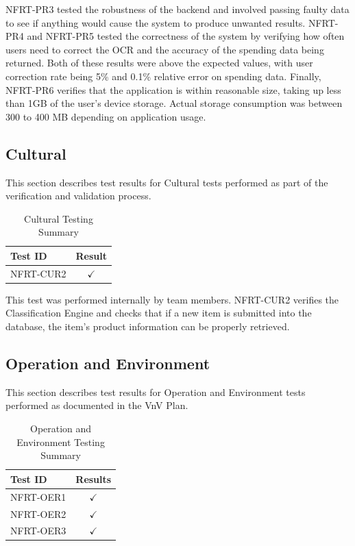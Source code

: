 \documentclass[12pt, titlepage]{article}
\begin{document}
NFRT-PR3 tested the robustness of the backend and involved passing faulty data to see if anything would cause the
system to produce unwanted results. NFRT-PR4 and NFRT-PR5 tested the correctness of the system by verifying how
often users need to correct the OCR and the accuracy of the spending data being returned. Both of these results
were above the expected values, with user correction rate being 5\% and 0.1\% relative error on spending data. Finally,
NFRT-PR6 verifies that the application is within reasonable size, taking up less than 1GB of the user's device
storage. Actual storage consumption was between 300 to 400 MB depending on application usage.

\subsection{Cultural}

This section describes test results for Cultural tests performed as part of the verification
and validation process.

\begin{longtable}{|l|c|}
  \caption{Cultural Testing Summary} \label{Cultural Testing Summary} \\
  \toprule
  \textbf{Test ID} & \textbf{Result} \\
  \midrule
  NFRT-CUR2 & $\checkmark$ \\
  \bottomrule
\end{longtable}

This test was performed internally by team members. NFRT-CUR2 verifies the Classification Engine
and checks that if a new item is submitted into the database, the item's product information can be
properly retrieved.

\subsection{Operation and Environment}

This section describes test results for Operation and Environment tests performed as documented
in the VnV Plan.

\begin{longtable}{|l|c|}
  \caption{Operation and Environment Testing Summary} \label{Operation and Environment Testing Summary} \\
  \toprule
  \textbf{Test ID} & \textbf{Results} \\
  \midrule
  NFRT-OER1 & $\checkmark$ \\
  \midrule
  NFRT-OER2 & $\checkmark$ \\
  \midrule
  NFRT-OER3 & $\checkmark$ \\ 
  \bottomrule
\end{longtable}
\end{document}
